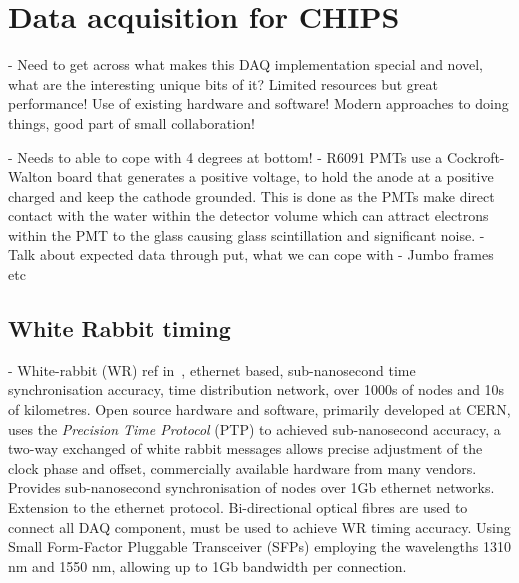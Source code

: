 \chapter{Data acquisition for CHIPS} %
\label{chap:daq} %

- Need to get across what makes this DAQ implementation special and novel, what are the
interesting unique bits of it? Limited resources but great performance! Use of existing hardware
and software! Modern approaches to doing things, good part of small collaboration!

- Needs to able to cope with 4 degrees at bottom!
- R6091 PMTs use a Cockroft-Walton board that generates a positive voltage, to hold the anode at a
positive charged and keep the cathode grounded. This is done as the PMTs make direct contact with
the water within the detector volume which can attract electrons within the PMT to the glass
causing glass scintillation and significant noise.
- Talk about expected data through put, what we can cope with
- Jumbo frames etc

\section{White Rabbit timing} %
\label{sec:daq_timing} %

- White-rabbit (WR) ref in~\cite{lipinski2011}, ethernet based, sub-nanosecond time
synchronisation accuracy, time distribution network, over 1000s of nodes and 10s of kilometres.
Open source hardware and software, primarily developed at CERN, uses the \emph{Precision Time
    Protocol} (PTP) to achieved sub-nanosecond accuracy, a two-way exchanged of white rabbit messages
allows precise adjustment of the clock phase and offset, commercially available hardware from many
vendors. Provides sub-nanosecond synchronisation of nodes over 1Gb ethernet networks. Extension to
the ethernet protocol. Bi-directional optical fibres are used to connect all DAQ component, must
be used to achieve WR timing accuracy. Using Small Form-Factor Pluggable Transceiver (SFPs)
employing the wavelengths 1310 nm and 1550 nm, allowing up to 1Gb bandwidth per connection.

